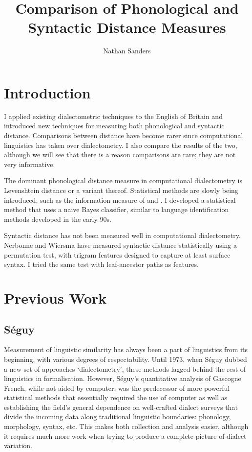 \documentclass[11pt]{article}
\title{Comparison of Phonological and Syntactic Distance Measures}
\author{Nathan Sanders}
\begin{document}
\maketitle
\doublespacing
\section{Introduction}

I applied existing dialectometric techniques to the English of Britain
and introduced new techniques for measuring both phonological and
syntactic distance. Comparisons between distance have become rarer
since computational linguistics has taken over dialectometry. I also
compare the results of the two, although we will see that there is a
reason comparisons are rare; they are not very informative.

The dominant phonological distance measure in computational
dialectometry is Levenshtein distance or a variant
thereof. Statistical methods are slowly being introduced, such as the
information measure of \cite{hinrichs07} and \cite{sanders08}.
I developed a statistical method that uses a naive Bayes
classifier, similar to language identification methods developed in
the early 90s.

Syntactic distance has not been measured well in computational
dialectometry. Nerbonne and Wiersma have measured syntactic distance
statistically using a permutation test, with trigram features designed
to capture at least surface syntax. I tried the same test with
leaf-ancestor paths as features.

\section{Previous Work}
\subsection{S\'eguy}
Measurement of linguistic similarity has always been a part of
linguistics from its beginning, with various degrees of
respectability. Until 1973, when S\'eguy dubbed a new set of
approaches `dialectometry', these methods lagged behind the rest of
linguistics in formalisation. However, S\'eguy's quantitative analysis
of Gascogne French, while not aided by computer, was the predecessor
of more powerful statistical methods that essentially required the use
of computer as well as establishing the field's general dependence on
well-crafted dialect surveys that divide the incoming data along
traditional linguistic boundaries: phonology, morphology, syntax, etc.
This makes both collection and analysis easier, although it requires
much more work when trying to produce a complete picture of dialect
variation.
\end{document}
